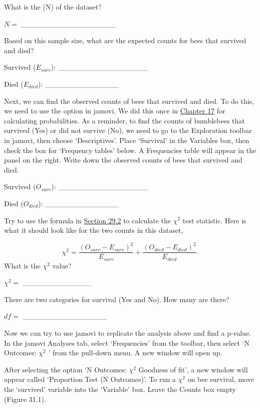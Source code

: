 \documentclass[
  openany]{krantz}
\begin{document}
\newpage

What is the  (N) of the dataset?

\(N =\) \_\_\_\_\_\_\_\_\_\_\_\_\_\_\_\_\_\_

Based on this sample size, what are the expected counts for bees that survived and died?

Survived (\(E_{surv}\)): \_\_\_\_\_\_\_\_\_\_\_\_\_\_\_\_\_

Died (\(E_{died}\)): \_\_\_\_\_\_\_\_\_\_\_\_\_\_

Next, we can find the observed counts of bees that survived and died.
To do this, we need to use the  option in jamovi.
We did this once in \protect\hyperlink{Chapter_17}{Chapter 17} for calculating probabilities.
As a reminder, to find the counts of bumblebees that survived (Yes) or did not survive (No), we need to go to the Exploration toolbar in jamovi, then choose `Descriptives'.
Place `Survival' in the Variables box, then check the box for `Frequency tables' below.
A Frequencies table will appear in the panel on the right.
Write down the observed counts of bees that survived and died.

Survived (\(O_{surv}\)): \_\_\_\_\_\_\_\_\_\_\_\_\_\_\_\_\_

Died (\(O_{died}\)): \_\_\_\_\_\_\_\_\_\_\_\_\_\_

Try to use the formula in \protect\hyperlink{chi-squared-goodness-of-fit}{Section 29.2} to calculate the \(\chi^{2}\) test statistic.
Here is what it should look like for the two counts in this dataset,

\[\chi^{2} = \frac{(O_{surv} - E_{surv})^{2}}{E_{surv}} + \frac{(O_{died} - E_{died})^{2}}{E_{died}}.\]
What is the \(\chi^{2}\) value?

\(\chi^{2} =\) \_\_\_\_\_\_\_\_\_\_\_\_\_

There are two categories for survival (Yes and No).
How many  are there?

\(df =\) \_\_\_\_\_\_\_\_\_\_\_\_\_\_\_\_

Now we can try to use jamovi to replicate the analysis above and find a p-value.
In the jamovi Analyses tab, select `Frequencies' from the toolbar, then select `N Outcomes: \(\chi^{2}\) ' from the pull-down menu.
A new window will open up.

After selecting the option `N Outcomes: \(\chi^{2}\) Goodness of fit', a new window will appear called `Proportion Test (N Outcomes)'.
To run a \(\chi^{2}\)  on bee survival, move the `survived' variable into the `Variable' box.
Leave the Counts box empty (Figure 31.1).
\end{document}
